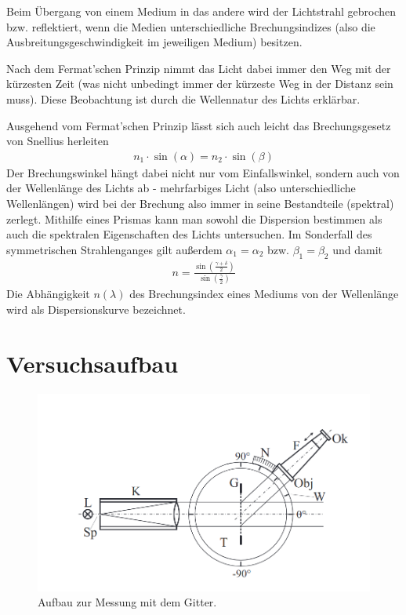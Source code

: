 \documentclass{article}
\begin{document}
Beim Übergang von einem Medium in das andere wird der Lichtstrahl gebrochen bzw. reflektiert, wenn die Medien unterschiedliche Brechungsindizes (also die Ausbreitungsgeschwindigkeit im jeweiligen Medium) besitzen.

Nach dem Fermat'schen Prinzip nimmt das Licht dabei immer den Weg mit der kürzesten Zeit (was nicht unbedingt immer der kürzeste Weg in der Distanz sein muss). Diese Beobachtung ist durch die Wellennatur des Lichts erklärbar.

Ausgehend vom Fermat'schen Prinzip lässt sich auch leicht das Brechungsgesetz von Snellius herleiten
\begin{align*}
n_1\cdot\sin(\alpha) = n_2\cdot\sin(\beta)
\end{align*}
Der Brechungswinkel hängt dabei nicht nur vom Einfallswinkel, sondern auch von der Wellenlänge des Lichts ab - mehrfarbiges Licht (also unterschiedliche Wellenlängen) wird bei der Brechung also immer in seine Bestandteile (spektral) zerlegt. Mithilfe eines Prismas kann man sowohl die Dispersion bestimmen als auch die spektralen Eigenschaften des Lichts untersuchen. Im Sonderfall des symmetrischen Strahlenganges gilt außerdem $\alpha_1 = \alpha_2$ bzw. $\beta_1 = \beta_2$ und damit
\begin{align}
\label{eq:brechung}
n = \frac{\sin\left(\frac{\gamma + \delta}{2}\right)}{\sin\left(\frac{\gamma}{2}\right)}
\end{align}
Die Abhängigkeit $n(\lambda)$ des Brechungsindex eines Mediums von der Wellenlänge wird als Dispersionskurve bezeichnet.


\section{Versuchsaufbau}


\begin{figure}[H]
\centering
\includegraphics[scale=1.5]{gitter.png}
\caption{Aufbau zur Messung mit dem Gitter.}
\label{fig:gitter}
\end{figure}
\end{document}
